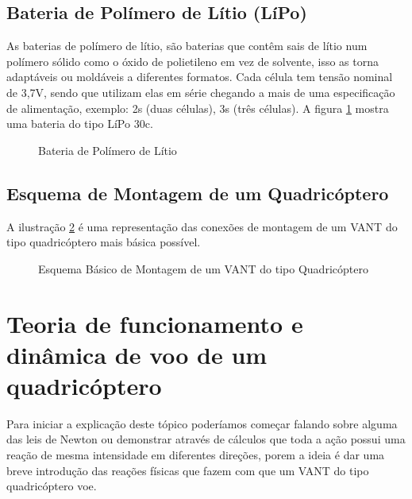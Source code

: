 \subsection{Bateria de Polímero de Lítio (LíPo)}
As baterias de polímero de lítio, são baterias que contêm sais de lítio num polímero sólido como o óxido de polietileno em vez de solvente, isso as torna adaptáveis ou moldáveis a diferentes formatos. Cada célula tem tensão nominal de 3,7V, sendo que utilizam elas em série chegando a mais de uma especificação de alimentação, exemplo: 2s (duas células), 3s (três células). A figura \ref{fig:bat} mostra uma bateria do tipo LíPo 30c.
\begin{figure}[H]
	\centering
	\caption{Bateria de Polímero de Lítio}
	\fontsize{9pt}{12pt}\selectfont
	\def\svgwidth{10cm}
	
	\label{fig:bat}
\end{figure}

\subsection{Esquema de Montagem de um Quadricóptero}

A ilustração \ref{fig:esquemamont} é uma representação das conexões de montagem de um VANT do tipo quadricóptero mais básica possível.

\begin{figure}[H]
  \centering
  \caption{Esquema Básico de Montagem de um VANT do tipo Quadricóptero}
  \fontsize{9pt}{12pt}\selectfont
  \def\svgwidth{12cm}
  
  \label{fig:esquemamont}
\end{figure}
\section{Teoria de funcionamento e dinâmica de voo de um quadricóptero}

Para iniciar a explicação deste tópico poderíamos começar falando sobre alguma das leis de Newton ou demonstrar através de cálculos que toda a ação possui uma reação de mesma intensidade em diferentes direções, porem a ideia é dar uma breve introdução das reações físicas que fazem com que um VANT do tipo quadricóptero voe. 

